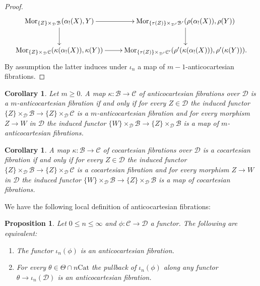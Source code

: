 \documentclass[10pt,oneside]{article}
\numberwithin{equation}{section} %
\numberwithin{figure}{section} %
\theoremstyle{plain}
\newtheorem{proposition}[theorem]{Proposition}
\newtheorem{corollary}[theorem]{Corollary}
\theoremstyle{definition}
\newcommand{\mB}{{\mathcal B}}
\newcommand{\mC}{{\mathcal C}}
\newcommand{\mD}{{\mathcal D}}
\newcommand{\Cat}{\mathrm{Cat}}
\newcommand{\Mor}{{\mathrm{Mor}}}
\begin{document}
\begin{proof}
\begin{equation*}
\begin{xy}
\xymatrix{
\Mor_{\{Z\} \times_\mD \mB}(\alpha_!(X),Y) \ar[d] \ar[r]
& \Mor_{\{\tau(Z)\} \times_{\mD'} \mB'}(\rho(\alpha_!(X)),\rho(Y)) \ar[d]
\\ 
\Mor_{\{Z\} \times_\mD \mC}(\kappa(\alpha_!(X)),\kappa(Y)) \ar[r] & \Mor_{\{\tau(Z)\} \times_{\mD'} \mC'}(\rho'(\kappa(\alpha_!(X))),\rho'(\kappa(Y))).
}
\end{xy}\end{equation*}
By assumption the latter induces under $\iota_n$ a map of $m-1$-anticocartesian fibrations.
\end{proof}

\begin{corollary}Let $m \geq 0.$
A map $\kappa: \mB \to \mC$ of anticocartesian fibrations over $\mD$ is a $m$-anticocartesian fibration if and only if for every $Z \in \mD$ the induced functor 
$
\{Z\} \times_\mD \mB \to  \{Z\} \times_\mD \mC
$
is a $m$-anticocartesian fibration and for every morphism $Z \to W$ in $\mD$ the induced functor
$\{W\} \times_\mD \mB \to \{Z\} \times_\mD \mB$
is a map of $m$-anticocartesian fibrations.
   
\end{corollary}

\begin{corollary}\label{paracocart}
A map $\kappa: \mB \to \mC$ of cocartesian fibrations over $\mD$ is a cocartesian fibration if and only if for every $Z \in \mD$ the induced functor 
$
\{Z\} \times_\mD \mB \to  \{Z\} \times_\mD \mC
$
is a cocartesian fibration and for every morphism $Z \to W$ in $\mD$ the induced functor
$\{W\} \times_\mD \mB \to \{Z\} \times_\mD \mB$
is a map of cocartesian fibrations.
   
\end{corollary}




We have the following local definition of anticocartesian fibrations:

\begin{proposition}\label{pua} Let $0 \leq n \leq \infty$ and $\phi: \mC \to \mD$ a functor.
The following are equivalent:

\begin{enumerate}[\normalfont(1)]\setlength{\itemsep}{-2pt}
\item The functor $\iota_n(\phi)$ is an anticocartesian fibration.

\item For every $\theta \in \Theta \cap n\Cat$ the pullback of $\iota_n(\phi)$ along any functor $\theta \to \iota_n(\mD)$ is an anticocartesian fibration.

\end{enumerate}

\end{proposition}
\end{document}
